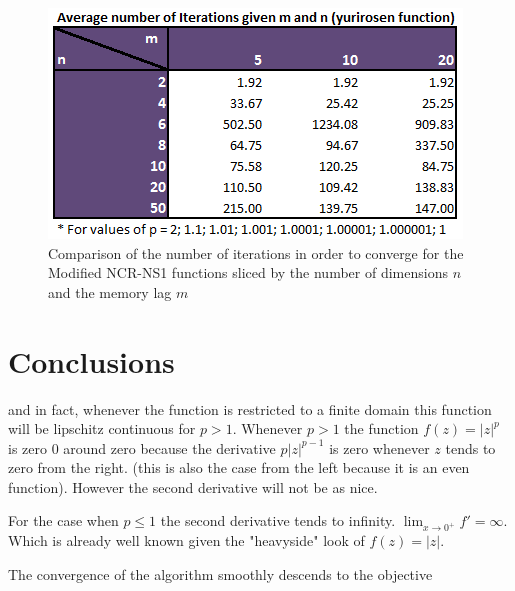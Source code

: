 \begin{figure}
\begin{center}
\includegraphics[scale=0.9]{Figures/yurirosenmn.PNG}
\caption[Comparison of selected values of the Modified NCR-NS1 function sliced by m and n]{Comparison of the number of iterations in order to converge for the Modified NCR-NS1 functions sliced by the number of dimensions $n$ and the memory lag $m$}
\label{yurimn}
\end{center}
\end{figure} 

\chapter{Conclusions}

and in fact, whenever the function is restricted to a finite domain this function will be lipschitz continuous for $p > 1$. Whenever $p > 1$ the function $f(z) = |z|^p$ is zero $0$ around zero because the derivative $p |z| ^{p-1}$ is zero whenever $z$ tends to zero from the right. (this is also the case from the left because it is an even function). However the second derivative will not be as nice.

For the case when $p \leq 1$ the second derivative tends to infinity. $\displaystyle \lim_{x \to 0^+} {f' = \infty}$. Which is already well known given the "heavyside" look of $f(z) = |z|$.

The convergence of the algorithm smoothly descends to the objective 

